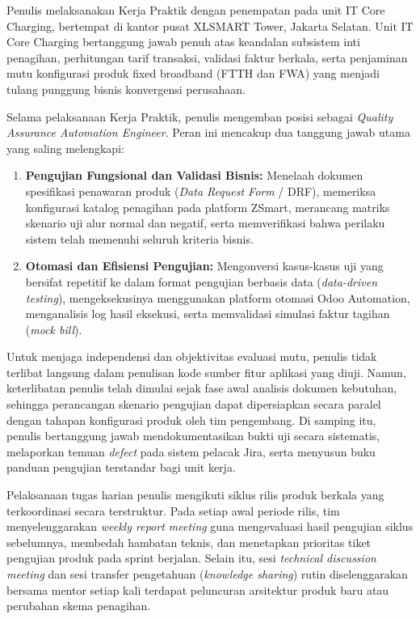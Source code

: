 \documentclass[12pt,a4paper]{article}
\begin{document}
Penulis melaksanakan Kerja Praktik dengan penempatan pada unit IT Core Charging, bertempat di kantor pusat XLSMART Tower, Jakarta Selatan. Unit IT Core Charging bertanggung jawab penuh atas keandalan subsistem inti penagihan, perhitungan tarif transaksi, validasi faktur berkala, serta penjaminan mutu konfigurasi produk fixed broadband (FTTH dan FWA) yang menjadi tulang punggung bisnis konvergensi perusahaan.

\vspace{0.2cm}
Selama pelaksanaan Kerja Praktik, penulis mengemban posisi sebagai \textit{Quality Assurance Automation Engineer}. Peran ini mencakup dua tanggung jawab utama yang saling melengkapi:
\begin{enumerate}[label=\arabic*.,leftmargin=1.5em,itemsep=2pt,topsep=2pt]
    \item \textbf{Pengujian Fungsional dan Validasi Bisnis:} Menelaah dokumen spesifikasi penawaran produk (\textit{Data Request Form} / DRF), memeriksa konfigurasi katalog penagihan pada platform ZSmart, merancang matriks skenario uji alur normal dan negatif, serta memverifikasi bahwa perilaku sistem telah memenuhi seluruh kriteria bisnis.
    \item \textbf{Otomasi dan Efisiensi Pengujian:} Mengonversi kasus-kasus uji yang bersifat repetitif ke dalam format pengujian berbasis data (\textit{data-driven testing}), mengeksekusinya menggunakan platform otomasi Odoo Automation, menganalisis log hasil eksekusi, serta memvalidasi simulasi faktur tagihan (\textit{mock bill}).
\end{enumerate}

Untuk menjaga independensi dan objektivitas evaluasi mutu, penulis tidak terlibat langsung dalam penulisan kode sumber fitur aplikasi yang diuji. Namun, keterlibatan penulis telah dimulai sejak fase awal analisis dokumen kebutuhan, sehingga perancangan skenario pengujian dapat dipersiapkan secara paralel dengan tahapan konfigurasi produk oleh tim pengembang. Di samping itu, penulis bertanggung jawab mendokumentasikan bukti uji secara sistematis, melaporkan temuan \textit{defect} pada sistem pelacak Jira, serta menyusun buku panduan pengujian terstandar bagi unit kerja.

\vspace{0.2cm}
Pelaksanaan tugas harian penulis mengikuti siklus rilis produk berkala yang terkoordinasi secara terstruktur. Pada setiap awal periode rilis, tim menyelenggarakan \textit{weekly report meeting} guna mengevaluasi hasil pengujian siklus sebelumnya, membedah hambatan teknis, dan menetapkan prioritas tiket pengujian produk pada sprint berjalan. Selain itu, sesi \textit{technical discussion meeting} dan sesi transfer pengetahuan (\textit{knowledge sharing}) rutin diselenggarakan bersama mentor setiap kali terdapat peluncuran arsitektur produk baru atau perubahan skema penagihan.
\end{document}
